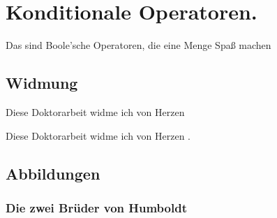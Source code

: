 
\chapter{Konditionale Operatoren.} 
Das sind Boole’sche Operatoren, die eine Menge Spaß machen

\section{Widmung}


\toggletrue{hund}

Diese Doktorarbeit widme ich von Herzen 
\iftoggle{hund}%
{meinem Hund.}%
{meinen lieben Eltern.}%

\togglefalse{hund}

Diese Doktorarbeit widme ich von Herzen 
\iftoggle{hund}%
{meinem Hund.}%
{meinen lieben Eltern.}.%



\section{Abbildungen}

\subsection{Die zwei Brüder von Humboldt}

